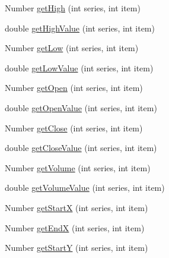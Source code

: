 \begin{DoxyCompactItemize}
Number \mbox{\hyperlink{classorg_1_1jfree_1_1data_1_1general_1_1_combined_dataset_a6709a0b24bb619f18f80d1f70b7d7019}{get\+High}} (int series, int item)
\item 
double \mbox{\hyperlink{classorg_1_1jfree_1_1data_1_1general_1_1_combined_dataset_a17e07dbe03ac67b77b4aa57e17f7b61a}{get\+High\+Value}} (int series, int item)
\item 
Number \mbox{\hyperlink{classorg_1_1jfree_1_1data_1_1general_1_1_combined_dataset_a2efcaba52f70e4982cc7872fcf447bfb}{get\+Low}} (int series, int item)
\item 
double \mbox{\hyperlink{classorg_1_1jfree_1_1data_1_1general_1_1_combined_dataset_a6bbbc0af890605eb5a42974c29a9c85b}{get\+Low\+Value}} (int series, int item)
\item 
Number \mbox{\hyperlink{classorg_1_1jfree_1_1data_1_1general_1_1_combined_dataset_a9113b1e7b51c716176aa3f8e954d0e7a}{get\+Open}} (int series, int item)
\item 
double \mbox{\hyperlink{classorg_1_1jfree_1_1data_1_1general_1_1_combined_dataset_a6f455c326e5f591bc1ef4b90b7bb4499}{get\+Open\+Value}} (int series, int item)
\item 
Number \mbox{\hyperlink{classorg_1_1jfree_1_1data_1_1general_1_1_combined_dataset_a7f58c968f7c5b50b3e122c49f5d33069}{get\+Close}} (int series, int item)
\item 
double \mbox{\hyperlink{classorg_1_1jfree_1_1data_1_1general_1_1_combined_dataset_ad1bc2a134c68b370da40608ce58a6b36}{get\+Close\+Value}} (int series, int item)
\item 
Number \mbox{\hyperlink{classorg_1_1jfree_1_1data_1_1general_1_1_combined_dataset_abd11201b4e46155128c2662fc54aa72c}{get\+Volume}} (int series, int item)
\item 
double \mbox{\hyperlink{classorg_1_1jfree_1_1data_1_1general_1_1_combined_dataset_a8d5839a8b62e420e5f7cab7106440a19}{get\+Volume\+Value}} (int series, int item)
\item 
Number \mbox{\hyperlink{classorg_1_1jfree_1_1data_1_1general_1_1_combined_dataset_ac4979232d9b53df764eb427259e2b104}{get\+StartX}} (int series, int item)
\item 
Number \mbox{\hyperlink{classorg_1_1jfree_1_1data_1_1general_1_1_combined_dataset_a28df4ee7d3f9678e84d3404305c13cb9}{get\+EndX}} (int series, int item)
\item 
Number \mbox{\hyperlink{classorg_1_1jfree_1_1data_1_1general_1_1_combined_dataset_a61823c1340aecd2cdb79536f78ca1d89}{get\+StartY}} (int series, int item)
\item 

\end{DoxyCompactItemize}
